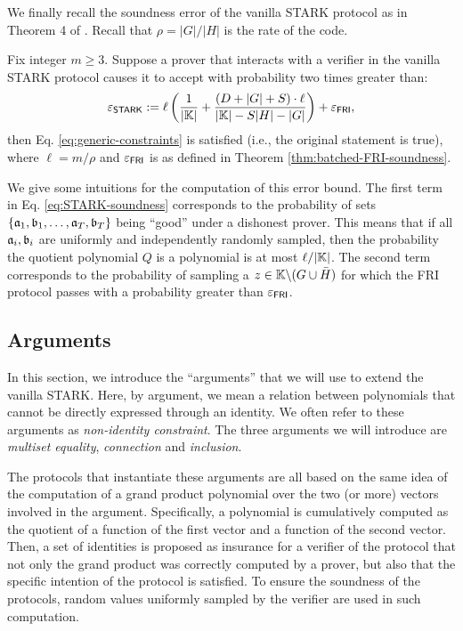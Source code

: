 We finally recall the soundness error of the vanilla STARK protocol as in Theorem 4 of \cite{EPRINT:StarkWare21}. Recall that $\rho = |G|/|H|$ is the rate of the code. 
\begin{theorem}[Soundness]\label{thm:STARK-soundness}
  Fix integer $m \geq 3$. Suppose a prover that interacts with a verifier in the vanilla STARK protocol causes it to accept with probability two times greater than:
  \begin{equation}\label{eq:STARK-soundness}
    \varepsilon_{\textsf{STARK}} := \ell \left(\frac{1}{|\mathbb{K}|} + \frac{(D + |G| + S)\cdot \ell}{|\mathbb{K}|-S|H|-|G|} \right) + \varepsilon_{\textsf{FRI}},
  \end{equation}
  then Eq. \eqref{eq:generic-constraints} is satisfied (i.e., the original statement is true), where $\ell = m/\rho$ and $\varepsilon_{\textsf{FRI}}$ is as defined in Theorem \ref{thm:batched-FRI-soundness}.
\end{theorem}
We give some intuitions for the computation of this error bound. The first term in Eq. \eqref{eq:STARK-soundness} corresponds to the probability of sets $\{\mathfrak{a}_1,\mathfrak{b}_1,\dots,\mathfrak{a}_T,\mathfrak{b}_T\}$ being ``good'' under a dishonest prover. This means that if all $\mathfrak{a}_i,\mathfrak{b}_i$ are uniformly and independently randomly sampled, then the probability the quotient polynomial $Q$ is a polynomial is at most $\ell/|\mathbb{K}|$. The second term corresponds to the probability of sampling a $z \in \mathbb{K} \backslash (G \cup \bar{H})$ for which the FRI protocol passes with a probability greater than $\varepsilon_{\textsf{FRI}}$.


\subsection{Arguments}\label{sec:preliminaries:arguments}

In this section, we introduce the ``arguments'' that we will use to extend the vanilla STARK. Here, by argument, we mean a relation between polynomials that cannot be directly expressed through an identity. We often refer to these arguments as \textit{non-identity constraint}. The three arguments we will introduce are \textit{multiset equality}, \textit{connection} and \textit{inclusion}.

The protocols that instantiate these arguments are all based on the same idea of the computation of a grand product polynomial over the two (or more) vectors involved in the argument. Specifically, a polynomial is cumulatively computed as the quotient of a function of the first vector and a function of the second vector. Then, a set of identities is proposed as insurance for a verifier of the protocol that not only the grand product was correctly computed by a prover, but also that the specific intention of the protocol is satisfied. To ensure the soundness of the protocols, random values uniformly sampled by the verifier are used in such computation.


